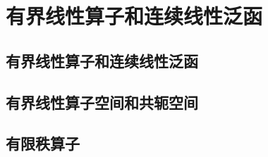 \chapter{有界线性算子和连续线性泛函}

\section{有界线性算子和连续线性泛函}\label{sec:2.1}



\section{有界线性算子空间和共轭空间}\label{sec:2.2}




\section{有限秩算子}\label{sec:2.3}









